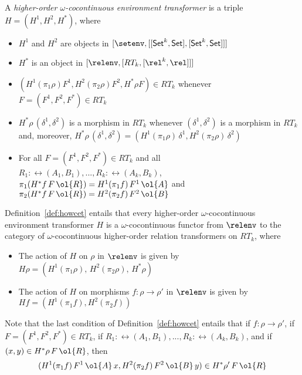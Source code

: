 \documentclass{lmcs}
\theoremstyle{plain}\newtheorem{satz}[thm]{Satz}
\newcommand{\set}{\mathsf{Set}}
\begin{document}
\begin{defi}\label{def:howcet}
A {\em higher-order $\omega$-cocontinuous environment transformer}
is a triple $H = (H^1,H^2,H^*)$, where
\begin{itemize}
\item $H^1$ and $H^2$ are objects in
  $[\setenv,[[\set^k,\set],[\set^k,\set]]]$ 
\item $H^*$ is an object in $[\relenv,[RT_k,[\rel^k,\rel]]]$
\item $(H^1(\pi_1 \rho) F^1,H^2(\pi_2 \rho) F^2, H^* \rho F) \in
  RT_k$ whenever $F = (F^1,F^2,F^*) \in RT_k$
\item $H^*\rho\, (\delta^1, \delta^2)$ is a morphism in $RT_k$
  whenever $(\delta^1, \delta^2)$ is a morphism in $RT_k$ and,
  moreover, $H^*\rho\, (\delta^1, \delta^2) = (H^1(\pi_1
  \rho)\,\delta^1, H^2(\pi_2 \rho)\, \delta^2)$
\item For all $F = (F^1,F^2,F^*) \in RT_k$ and all $R_1 :
  \rel(A_1,B_1),...,R_k : \rel(A_k,B_k)$, $\pi_1(H^* f \,F\,\ol{R}) =
  H^1 (\pi_1 f)\,F^1\,\ol{A}$ and $\pi_2(H^*f \,F\,\ol{R}) = H^2
  (\pi_2 f)\,F^2\,\ol{B}$
\end{itemize}
\end{defi}
\noindent
Definition~\ref{def:howcet} entails that every higher-order
$\omega$-cocontinuous environment transformer $H$ is a
$\omega$-cocontinuous functor from $\relenv$ to
the category of $\omega$-cocontinuous higher-order
relation transformers on $RT_k$, where
\begin{itemize}
\item The action of $H$ on $\rho$ in $\relenv$ is given by $H \rho = (H^1
  (\pi_1 \rho),\,H^2 (\pi_2 \rho),\,H^*\rho)$
\item The action of $H$ on morphisms $f : \rho \to \rho'$ in $\relenv$
  is given by $Hf = (H^1 (\pi_1 f),H^2 (\pi_2 f))$
\end{itemize}
\noindent
Note that the last condition of Definition~\ref{def:howcet} entails
that if $f : \rho \to \rho'$, if $F = (F^1,F^2,F^*) \in RT_k$, if $R_1 :
\rel(A_1,B_1),...,R_k : \rel(A_k,B_k)$, and if $(x, y) \in
H^*\rho\,F\,\ol{R}$, then \[(H^1(\pi_1 f)\,F^1\,\ol{A}\,x, H^2(\pi_2
f)\,F^2\,\ol{B}\,y) \in H^*\rho'\,F\,\ol{R}\]
\end{document}
